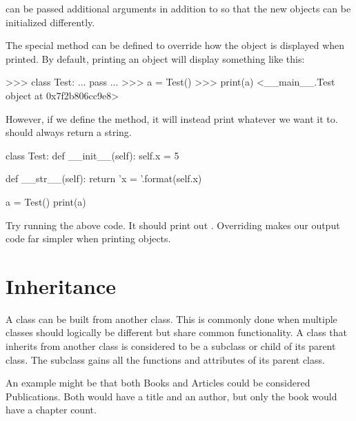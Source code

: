\documentclass[11pt]{cselabheader}
\begin{document}
 can be passed additional arguments in addition to
 so that the new objects can be initialized differently.

The special method  can be defined to override
how the object is displayed when printed. By default, printing an object will
display something like this:

\begin{pyconcode}
>>> class Test:
...     pass
...
>>> a = Test()
>>> print(a)
<__main__.Test object at 0x7f2b806cc9e8>
\end{pyconcode}

However, if we define the method, it will instead print whatever we want it
to.  should always return a string.

\begin{python3code}
class Test:
    def __init__(self):
        self.x = 5

    def __str__(self):
        return 'x = {}'.format(self.x)

a = Test()
print(a)
\end{python3code}

Try running the above code. It should print out . Overriding
 makes our output code far simpler when printing objects.

\section{Inheritance}
\label{sec:inheritance}
A class can be built from another class. This is commonly done when multiple
classes should logically be different but share common functionality. A class
that inherits from another class is considered to be a subclass or child of
its parent class. The subclass gains all the functions and attributes of
its parent class.

An example
might be that both Books and Articles could be considered Publications. Both
would have a title and an author, but only the book would have a chapter count.
\end{document}
